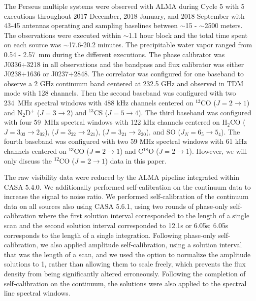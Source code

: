 
The Perseus multiple systems were observed with ALMA during
Cycle 5 with 5 executions throughout 2017 December, 2018 January, and 2018 September with 43-45 
antennas operating and sampling baselines between $\sim$15 - $\sim$2500 meters. 
The observations were executed within $\sim$1.1 hour block
and the total time spent on each source was $\sim$17.6-20.2 minutes. 
The precipitable water vapor ranged from 0.54 - 2.57~mm during the different executions.
The phase calibrator was J0336+3218 in all observations and the bandpass and flux calibrator was either
J0238+1636 or J0237+2848.
The correlator was configured for one baseband to observe a 2 GHz continuum band 
centered at 232.5 GHz and observed in TDM mode with 128 channels. Then the second baseband
was configured with two 234~MHz spectral windows with 488 kHz channels centered on $^{12}$CO ($J=2\rightarrow1$) and
N$_2$D$^{+}$ ($J=3\rightarrow2$) and $^{13}$CS ($J=5\rightarrow4$). The third baseband was configured with four
59~MHz spectral windows with 122 kHz channels centered on H$_2$CO ($J=3_{03}\rightarrow2_{02}$), ($J=3_{22}\rightarrow2_{21}$), 
($J=3_{21}\rightarrow2_{20}$), and SO ($J_N = 6_5\rightarrow5_4$). The fourth baseband was configured with two 59 MHz spectral windows with 61 kHz channels
centered on $^{13}$CO ($J=2\rightarrow1$) and C$^{18}$O ($J=2\rightarrow1$). However, we will only discuss the $^{12}$CO ($J=2\rightarrow1$)
data in this paper.

The raw visibility data were reduced by the ALMA pipeline integrated within CASA 5.4.0. We additionally performed
self-calibration on the continuum data to increase the signal to noise ratio. We performed 
self-calibration of the continuum data on all sources also using CASA 5.6.1, using two rounds of phase-only self-calibration where the first solution
interval corresponded to the length of a single scan and the second solution interval corresponded 
to 12.1s or 6.05s; 6.05s corresponds to the length of a single integration. Following phase-only
self-calibration, we also applied amplitude self-calibration, using a solution interval that was 
the length of a scan, and we used the option  to normalize the amplitude solutions to 1, rather than
allowing them to scale freely, which prevents the flux density from being significantly altered erroneously.
Following the completion of self-calibration on the continuum, the solutions were also applied to the 
spectral line spectral windows.

